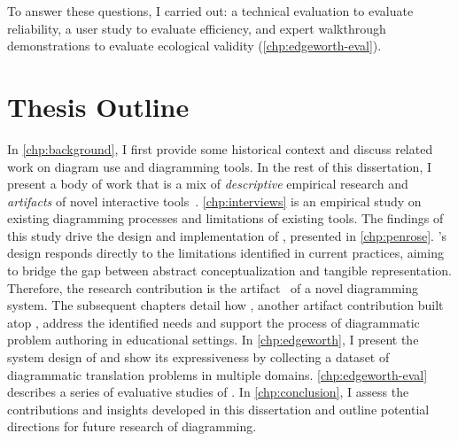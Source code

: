 To answer these questions, I carried out: a technical evaluation to evaluate reliability, a user study to evaluate efficiency, and expert walkthrough demonstrations to evaluate ecological validity (\cref{chp:edgeworth-eval}). 






\section{Thesis Outline}



In \cref{chp:background}, I first provide some historical context and discuss related work on diagram use and diagramming tools. In the rest of this dissertation, I present a body of work that is a mix of \textit{descriptive} empirical research and \textit{artifacts} of novel interactive tools~\cite{wobbrock_research_2016}.  \cref{chp:interviews} is an empirical study on existing diagramming processes and limitations of existing tools.
The findings of this study drive the design and implementation of \Penrose, presented in \cref{chp:penrose}. \Penrose's design responds directly to the limitations identified in current practices, aiming to bridge the gap between abstract conceptualization and tangible representation. Therefore, the research contribution is the artifact~\cite{wobbrock_research_2016} of a novel diagramming system. The subsequent chapters detail how \Edgeworth, another artifact contribution built atop \Penrose, address the identified needs and support the process of diagrammatic problem authoring in educational settings. In \cref{chp:edgeworth}, I present the system design of \Edgeworth and show its expressiveness by collecting a dataset of diagrammatic translation problems in multiple domains. \cref{chp:edgeworth-eval} describes a series of evaluative studies of \Edgeworth. In \cref{chp:conclusion}, I assess the contributions and insights developed in this dissertation and outline potential directions for future research of diagramming.
